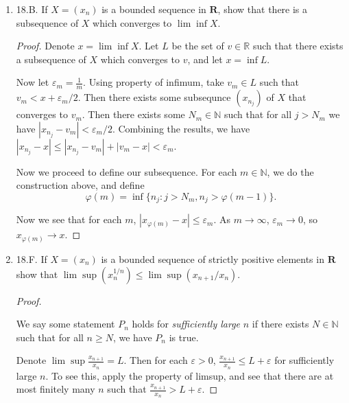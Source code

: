 \begin{enumerate}
\begin{proof}
	Finally, $F_1$ is bounded since $K_1$ is bounded.
	Now by the cantor intersection theorem, there exists a point $k^*$ belonging to all the sets $F_n$. Thus $\varphi(k^*) \le u + \frac{1}{n}$ for all $n \in \mathbb{N}$, so $\varphi(k^*) = u$. We can easily verify from the definition that $ x_1:=k^*$ and $x_2 := k_2(k^*)$ satisfy desired properties.
\end{proof}

	\item 18.B. If $X=\left(x_n\right)$ is a bounded sequence in $\boldsymbol{R}$, show that there is a subsequence of $X$ which converges to $\lim \inf X$.
\begin{proof}
	Denote $x = \lim \inf X$. Let $L$ be the set of $v \in \mathbb{R}$ such that there exists a subsequence of $X$ which converges to $v$, and let $x = \operatorname{inf} L$. 

	Now let $\varepsilon_m = \frac{1}{m}$. Using property of infimum, take $v_m \in L$ such that $v_m < x + \varepsilon_m / 2$. Then there exists some subsequnce $(x_{n_j})$ of $X$ that converges to $v_m$. Then there exists some $N_m \in \mathbb{N}$ such that for all $j > N_m$ we have $|x_{n_j} - v_m | < \varepsilon_m / 2$.
	Combining the results, we have $|x_{n_j} - x| \le |x_{n_j} - v_m| + |v_m - x| <  \varepsilon_m$. 

	Now we proceed to define our subsequence.
	For each $m \in \mathbb{N}$, we do the construction above, and define
\[
	\varphi(m) = \operatorname{inf} 
	\{
		n_j: j>N_m, n_j > \varphi(m-1)
	\} 
.\] 

	Now we see that for each $m$, $|x_{\varphi(m)} - x|\le \varepsilon_m$. As $m \to \infty$, $\varepsilon_m \to 0$, so $x_{\varphi(m)} \to x$.
	
\end{proof}

	\item 18.F. If $X=\left(x_n\right)$ is a bounded sequence of strictly positive elements in $\boldsymbol{R}$ show that $\lim \sup \left(x_n^{1 / n}\right) \leq \lim \sup \left(x_{n+1} / x_n\right)$.
\begin{proof}
	\begin{notation}
		We say some statement $P_n$ holds for \textit{sufficiently large }$n$ if there exists $N \in \mathbb{N}$ such that for all  $n \ge  N$, we have $P_n$ is true.
	\end{notation}

	Denote $\lim \sup \frac{x_{n+1}}{x_n} = L$. Then for each $\varepsilon>0$, $\frac{x_{n+1}}{x_n}\le L + \varepsilon$ for sufficiently large $n$.
	To see this, apply the property of limsup, and see that there are at most finitely many $n$ such that $\frac{x_{n+1}}{x_n}>L + \varepsilon$.


\end{proof}
\end{enumerate}
